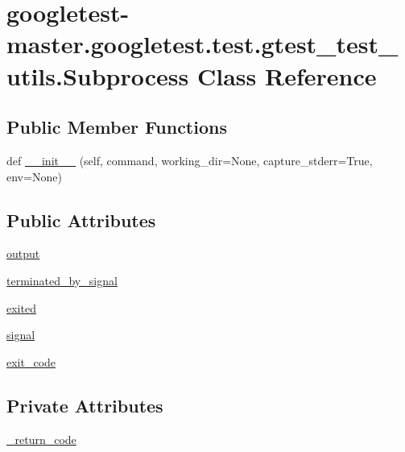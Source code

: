 \hypertarget{classgoogletest-master_1_1googletest_1_1test_1_1gtest__test__utils_1_1_subprocess}{}\section{googletest-\/master.googletest.\+test.\+gtest\+\_\+test\+\_\+utils.\+Subprocess Class Reference}
\label{classgoogletest-master_1_1googletest_1_1test_1_1gtest__test__utils_1_1_subprocess}
\subsection*{Public Member Functions}
\begin{DoxyCompactItemize}
\item 
def \mbox{\hyperlink{classgoogletest-master_1_1googletest_1_1test_1_1gtest__test__utils_1_1_subprocess_a25a470be4231964203fe17ab28d4ed0f}{\+\_\+\+\_\+init\+\_\+\+\_\+}} (self, command, working\+\_\+dir=None, capture\+\_\+stderr=True, env=None)
\end{DoxyCompactItemize}
\subsection*{Public Attributes}
\begin{DoxyCompactItemize}
\item 
\mbox{\hyperlink{classgoogletest-master_1_1googletest_1_1test_1_1gtest__test__utils_1_1_subprocess_ad97020279ff685cbeb8ba23afca807b8}{output}}
\item 
\mbox{\hyperlink{classgoogletest-master_1_1googletest_1_1test_1_1gtest__test__utils_1_1_subprocess_adc354d91a26bdde4b02eade06278f825}{terminated\+\_\+by\+\_\+signal}}
\item 
\mbox{\hyperlink{classgoogletest-master_1_1googletest_1_1test_1_1gtest__test__utils_1_1_subprocess_a97c523857e4351fdab700d5bb83f832d}{exited}}
\item 
\mbox{\hyperlink{classgoogletest-master_1_1googletest_1_1test_1_1gtest__test__utils_1_1_subprocess_a2aa600ddea9529cb0a65318935dd17e2}{signal}}
\item 
\mbox{\hyperlink{classgoogletest-master_1_1googletest_1_1test_1_1gtest__test__utils_1_1_subprocess_af945c7e2b54b35aaaa93d8e3ac977fa6}{exit\+\_\+code}}
\end{DoxyCompactItemize}
\subsection*{Private Attributes}
\begin{DoxyCompactItemize}
\item 
\mbox{\hyperlink{classgoogletest-master_1_1googletest_1_1test_1_1gtest__test__utils_1_1_subprocess_a9bfb44328d449e51a26e73048b01f7c9}{\+\_\+return\+\_\+code}}
\end{DoxyCompactItemize}


